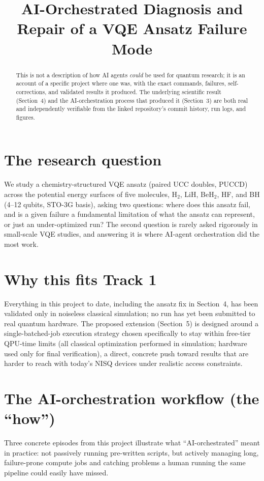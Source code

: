 \documentclass[11pt]{article}
\title{\large AI-Orchestrated Diagnosis and Repair of a VQE Ansatz Failure Mode}
\author{}
\date{}
\begin{document}
\maketitle
\vspace{-2.2em}

\begin{abstract}
\noindent This is not a description of how AI agents \emph{could} be used for quantum research; it is an account of a specific project where one was, with the exact commands, failures, self-corrections, and validated results it produced. The underlying scientific result (Section~4) and the AI-orchestration process that produced it (Section~3) are both real and independently verifiable from the linked repository's commit history, run logs, and figures.
\end{abstract}

\section{The research question}
We study a chemistry-structured VQE ansatz (paired UCC doubles, PUCCD) across the potential energy surfaces of five molecules, H$_2$, LiH, BeH$_2$, HF, and BH (4--12 qubits, STO-3G basis), asking two questions: where does this ansatz fail, and is a given failure a fundamental limitation of what the ansatz can represent, or just an under-optimized run? The second question is rarely asked rigorously in small-scale VQE studies, and answering it is where AI-agent orchestration did the most work.

\section{Why this fits Track 1}
Everything in this project to date, including the ansatz fix in Section~4, has been validated only in noiseless classical simulation; no run has yet been submitted to real quantum hardware. The proposed extension (Section~5) is designed around a single-batched-job execution strategy chosen specifically to stay within free-tier QPU-time limits (all classical optimization performed in simulation; hardware used only for final verification), a direct, concrete push toward results that are harder to reach with today's NISQ devices under realistic access constraints.

\section{The AI-orchestration workflow (the ``how'')}
Three concrete episodes from this project illustrate what ``AI-orchestrated'' meant in practice: not passively running pre-written scripts, but actively managing long, failure-prone compute jobs and catching problems a human running the same pipeline could easily have missed.
\end{document}
